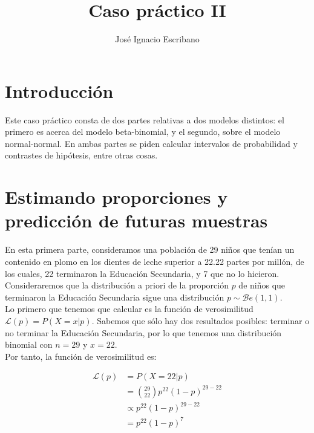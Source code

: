 \documentclass[12pt,a4paper,twoside,openright,titlepage,final]{article}
\author{José Ignacio Escribano}
\title{Caso práctico II}
\begin{document}
\setcounter{page}{1}


\listoffigures
\thispagestyle{empty}
\newpage

\tableofcontents
\thispagestyle{empty}
\newpage


\setcounter{page}{1}

\section{Introducción}

Este caso práctico consta de dos partes relativas a dos modelos distintos: el primero es acerca del modelo beta-binomial, y el segundo, sobre el modelo normal-normal. En ambas partes se piden calcular intervalos de probabilidad y contrastes de hipótesis, entre otras cosas.

\section{Estimando proporciones y predicción de futuras muestras}

En esta primera parte, consideramos una población de 29 niños que tenían un contenido en plomo en los dientes de leche superior a 22.22 partes por millón, de los cuales, 22 terminaron la Educación Secundaria, y 7 que no lo hicieron. Consideraremos que la distribución a priori de la proporción $p$ de niños que terminaron la Educación Secundaria sigue una distribución $p \sim \mathcal{B}e(1,1)$.\\

Lo primero que tenemos que calcular es la función de verosimilitud $\mathcal{L}(p) = P(X = x | p)$. Sabemos que sólo hay dos resultados posibles: terminar o no terminar la Educación Secundaria, por lo que tenemos una distribución binomial con $n = 29$ y $x = 22$.\\

Por tanto, la función de verosimilitud es:

\begin{align*}
\mathcal{L}(p) & = P(X = 22|p) \\ &= \binom{29}{22} p^{22} (1-p)^{29-22} \\ & \propto p^{22} (1-p)^{29-22} \\ & = p^{22}(1-p)^{7}
\end{align*}
\end{document}
